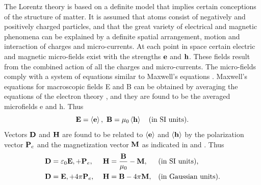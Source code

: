 The Lorentz theory is based on a definite model that implies certain conceptions of the structure of matter. It is assumed that atoms consist of negatively and positively charged particles, and that the great variety of electrical and magnetic phenomena can be explained by a definite spatial arrangement, motion and interaction of charges and micro-currents. At each point in space certain electric and magnetic micro-fields exist with the strengths $\vb{e}$ and $\vb{h}$. These fields result from the combined action of all the charges and micro-currents. The micro-fields comply with a system of equations similar to Maxwell's equations . Maxwell's equations for macroscopic fields E and B  can be obtained by averaging the equations of the electron theory , and they are found to be the averaged microfields e and h. Thus
\begin{equation*}%
\vb{E} = \expval{\vb{e}},\,\, \vb{B} = \mu_{0}\expval{\vb{h}} \quad \text{(in SI units).}
\end{equation*}
Vectors $\vb{D}$ and $\vb{H}$ are found to be related to $\expval{\vb{e}}$ and $\expval{\vb{h}}$ by the polarization vector $\vb{P}_{e}$  and the magnetization vector $\vb{M}$  as indicated in  and . Thus
\begin{align*}%
\vb{D} & = \varepsilon_{0} \vb{E}, + \vb{P}_{e},\,\, & \vb{H} & =\frac{\vb{B}}{\mu_{0}} - \vb{M}, && \text{(in SI units),} \\
\vb{D} & =  \vb{E}, + 4 \pi \vb{P}_{e},\,\, & \vb{H} & =\vb{B} - 4 \pi \vb{M}, && \text{(in Gaussian units).}
\end{align*}



